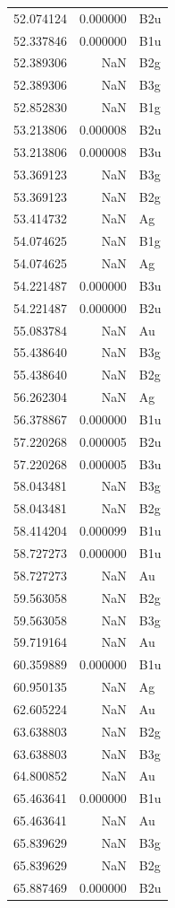 \begin{longtable}{rrl}
52.074124 & 0.000000 & B2u \\
52.337846 & 0.000000 & B1u \\
52.389306 & NaN & B2g \\
52.389306 & NaN & B3g \\
52.852830 & NaN & B1g \\
53.213806 & 0.000008 & B2u \\
53.213806 & 0.000008 & B3u \\
53.369123 & NaN & B3g \\
53.369123 & NaN & B2g \\
53.414732 & NaN & Ag \\
54.074625 & NaN & B1g \\
54.074625 & NaN & Ag \\
54.221487 & 0.000000 & B3u \\
54.221487 & 0.000000 & B2u \\
55.083784 & NaN & Au \\
55.438640 & NaN & B3g \\
55.438640 & NaN & B2g \\
56.262304 & NaN & Ag \\
56.378867 & 0.000000 & B1u \\
57.220268 & 0.000005 & B2u \\
57.220268 & 0.000005 & B3u \\
58.043481 & NaN & B3g \\
58.043481 & NaN & B2g \\
58.414204 & 0.000099 & B1u \\
58.727273 & 0.000000 & B1u \\
58.727273 & NaN & Au \\
59.563058 & NaN & B2g \\
59.563058 & NaN & B3g \\
59.719164 & NaN & Au \\
60.359889 & 0.000000 & B1u \\
60.950135 & NaN & Ag \\
62.605224 & NaN & Au \\
63.638803 & NaN & B2g \\
63.638803 & NaN & B3g \\
64.800852 & NaN & Au \\
65.463641 & 0.000000 & B1u \\
65.463641 & NaN & Au \\
65.839629 & NaN & B3g \\
65.839629 & NaN & B2g \\
65.887469 & 0.000000 & B2u \\

\end{longtable}
